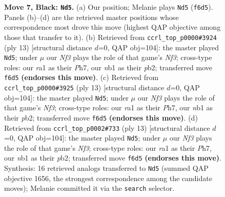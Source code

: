 \documentclass[11pt]{article}
\begin{document}
\begin{figure}[p]
\caption{\textbf{Move 7, Black: \texttt{Nd5}.} (a) Our position; Melanie plays \texttt{Nd5} (\texttt{f6d5}). Panels (b)--(d) are the retrieved master positions whose correspondence most drove this move (highest QAP objective among those that transfer to it). (b) Retrieved from \texttt{ccrl\_top\_p0000\#3924} (ply 13) [structural distance $d$=0, QAP obj=104]: the master played \texttt{Nd5}; under $\mu$ our \emph{Nf3} plays the role of that game's \emph{Nf3}; cross-type roles: our \emph{r}a1 as their \emph{P}h7, our \emph{n}b1 as their \emph{p}b2; transferred move \texttt{f6d5} \textbf{(endorses this move)}. (c) Retrieved from \texttt{ccrl\_top\_p0000\#3925} (ply 13) [structural distance $d$=0, QAP obj=104]: the master played \texttt{Nd5}; under $\mu$ our \emph{Nf3} plays the role of that game's \emph{Nf3}; cross-type roles: our \emph{r}a1 as their \emph{P}h7, our \emph{n}b1 as their \emph{p}b2; transferred move \texttt{f6d5} \textbf{(endorses this move)}. (d) Retrieved from \texttt{ccrl\_top\_p0002\#733} (ply 13) [structural distance $d$=0, QAP obj=104]: the master played \texttt{Nd5}; under $\mu$ our \emph{Nf3} plays the role of that game's \emph{Nf3}; cross-type roles: our \emph{r}a1 as their \emph{P}h7, our \emph{n}b1 as their \emph{p}b2; transferred move \texttt{f6d5} \textbf{(endorses this move)}. Synthesis: 16 retrieved analogs transferred to \texttt{Nd5} (summed QAP objective 1656, the strongest correspondence among the candidate moves); Melanie committed it via the \texttt{search} selector.}
\label{fig:thought-m13}
\end{figure}

\clearpage
\end{document}
